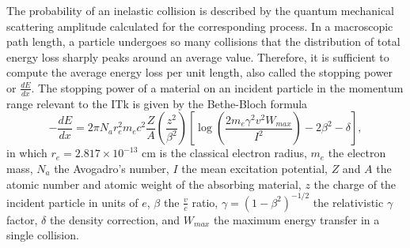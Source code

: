 The probability of an inelastic collision is described by the quantum mechanical scattering amplitude calculated for the corresponding process. 
In a macroscopic path length, a particle undergoes so many collisions that the distribution of total energy loss sharply peaks around an average value. 
Therefore, it is sufficient to compute the average energy loss per unit length, also called the stopping power or $\frac{dE}{dx}$. 
The stopping power of a material on an incident particle in the momentum range relevant to the ITk is given by the Bethe-Bloch formula \cite{Zyla:2020zbs}
\begin{equation}
    \label{eq:6.1}
    -\frac{dE}{dx} = 2\pi N_a r_e^2 m_e c^2 \frac{Z}{A} \left( \frac{z^2}{\beta^2}\right) \left[ \log \left( \frac{2m_e \gamma^2 v^2 W_{max}}{I^2}\right) - 2\beta^2 -\delta   \right],
\end{equation}
in which $r_e = 2.817\times 10^{-13}$ cm is the classical electron radius, $m_e$ the electron mass, $N_a$ the Avogadro's number, $I$ the mean excitation potential, $Z$ and $A$ the atomic number and atomic weight of the absorbing material, $z$ the charge of the incident particle in units of $e$, $\beta $ the $\frac{v}{c}$ ratio, $\gamma = (1-\beta^2)^{-1/2}$ the relativistic $\gamma$ factor, $\delta$ the density correction, and $W_{max}$ the maximum energy transfer in a single collision.
